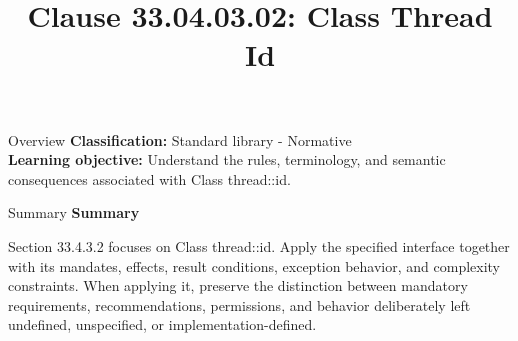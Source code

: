 \documentclass[10pt,letterpaper]{article}
\title{Clause 33.04.03.02: Class Thread Id}
\author{}
\date{}
\begin{document}
\maketitle
\begin{CornellOverviewBox}{Overview}
\textbf{Classification:} Standard library - Normative\\[2pt]
\textbf{Learning objective:} Understand the rules, terminology, and semantic consequences associated with Class thread::id.
\end{CornellOverviewBox}\begin{CornellSummaryBox}{Summary}
{\sffamily\bfseries\color{Accent} Summary}\par\vspace{3pt}Section 33.4.3.2 focuses on Class thread::id. Apply the specified interface together with its mandates, effects, result conditions, exception behavior, and complexity constraints. When applying it, preserve the distinction between mandatory requirements, recommendations, permissions, and behavior deliberately left undefined, unspecified, or implementation-defined.
\end{CornellSummaryBox}
\end{document}

